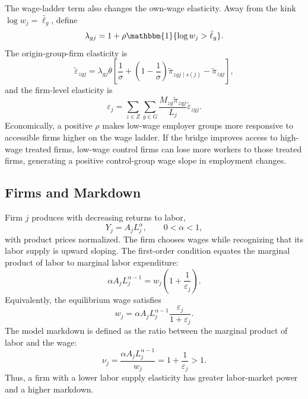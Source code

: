 \documentclass[12pt]{article}
\begin{document}
The wage-ladder term also changes the own-wage elasticity. Away from the kink \(\log w_j=\bar{\ell}_g\), define
\[
    \lambda_{gj}
    =
    1+\rho\mathbbm{1}\{\log w_j>\bar{\ell}_g\}.
\]
The origin-group-firm elasticity is
\begin{equation}
    \widetilde{\varepsilon}_{zgj}
    =
    \lambda_{gj}\theta
    \left[
    \frac{1}{\sigma}
    +
    \left(1-\frac{1}{\sigma}\right)\widetilde{\pi}_{zgj\mid s(j)}
    -
    \widetilde{\pi}_{zgj}
    \right],
    \label{eq:poaching_group_origin_elasticity}
\end{equation}
and the firm-level elasticity is
\begin{equation}
    \varepsilon_j
    =
    \sum_{z\in Z}\sum_{g\in G}
    \frac{M_{zg}\widetilde{\pi}_{zgj}}{L_j}
    \widetilde{\varepsilon}_{zgj}.
    \label{eq:poaching_group_firm_elasticity}
\end{equation}
Economically, a positive \(\rho\) makes low-wage employer groups more responsive to accessible firms higher on the wage ladder. If the bridge improves access to high-wage treated firms, low-wage control firms can lose more workers to those treated firms, generating a positive control-group wage slope in employment changes.

\subsection{Firms and Markdown}
Firm \(j\) produces with decreasing returns to labor,
\begin{equation}
    Y_j = A_j L_j^\alpha,
    \qquad 0<\alpha<1,
    \label{eq:model_production}
\end{equation}
with product prices normalized. The firm chooses wages while recognizing that its labor supply is upward sloping. The first-order condition equates the marginal product of labor to marginal labor expenditure:
\begin{equation}
    \alpha A_j L_j^{\alpha-1}
    =
    w_j\left(1+\frac{1}{\varepsilon_j}\right).
    \label{eq:model_foc}
\end{equation}
Equivalently, the equilibrium wage satisfies
\begin{equation}
    w_j
    =
    \alpha A_j L_j^{\alpha-1}
    \frac{\varepsilon_j}{1+\varepsilon_j}.
    \label{eq:model_wage_foc}
\end{equation}
The model markdown is defined as the ratio between the marginal product of labor and the wage:
\begin{equation}
    \nu_j
    =
    \frac{\alpha A_j L_j^{\alpha-1}}{w_j}
    =
    1+\frac{1}{\varepsilon_j}
    >
    1.
    \label{eq:model_markdown}
\end{equation}
Thus, a firm with a lower labor supply elasticity has greater labor-market power and a higher markdown.
\end{document}
